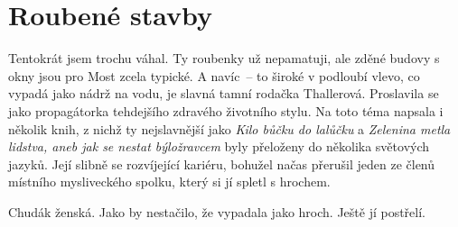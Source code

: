 
\chapter{Roubené stavby}

Tentokrát jsem trochu váhal. Ty roubenky už nepamatuji, ale zděné budovy s okny
jsou pro Most zcela typické. A navíc~-- to široké v podloubí vlevo, co vypadá
jako nádrž na vodu, je slavná tamní rodačka Thallerová. Proslavila se jako
propagátorka tehdejšího zdravého životního stylu. Na toto téma napsala i
několik knih, z nichž ty nejslavnější jako {\em Kilo bůčku do lalůčku} a {\em
Zelenina metla lidstva, aneb jak se nestat býložravcem} byly přeloženy do
několika světových jazyků. Její slibně se rozvíjející kariéru, bohužel načas
přerušil jeden ze členů místního mysliveckého spolku, který si jí spletl s
hrochem.

Chudák ženská. Jako by nestačilo, že vypadala jako hroch. Ještě jí
postřelí.
